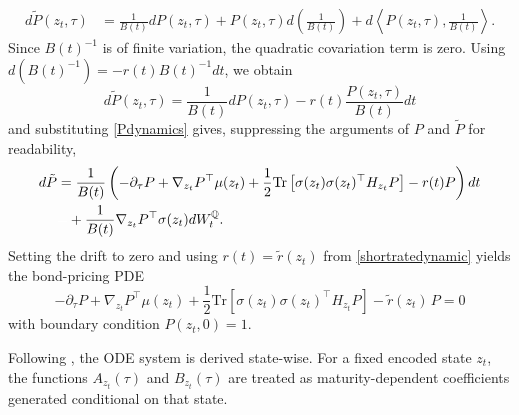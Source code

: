\begin{align*}
   d\tilde{P}(z_t,\tau)
&=
\frac{1}{B(t)}dP(z_t,\tau)
+
P(z_t,\tau)d\left(\frac{1}{B(t)}\right)
+
d\left\langle P(z_t,\tau),\frac{1}{B(t)}\right\rangle .
\end{align*}
Since \(B(t)^{-1}\) is of finite variation, the quadratic covariation term is zero. Using \(d(B(t)^{-1})=-r(t)B(t)^{-1}dt\), we obtain
$$ d\tilde{P}(z_t,\tau)=\frac{1}{B(t)}dP(z_t,\tau)-r(t)\frac{P(z_t,\tau)}{B(t)}dt$$
and substituting \eqref{Pdynamics} gives, suppressing the arguments of $P$ and $\tilde{P}$ for readability,
\begin{align*}
  d\tilde{P}&=\frac{1}{B(t)}\left(-\partial_\tau P+\nabla_{z_t} P^\top\mu(z_t)+\frac{1}{2}\mathrm{Tr}\left[\sigma(z_t)\sigma(z_t)^\top H_{z_t} P\right]-r(t)P\right)dt\\
  &\textcolor{white}{=}+\frac{1}{B(t)}\nabla_{z_t} P^\top\sigma(z_t)dW_t^\mathbb{Q}  .
\end{align*}
Setting the drift to zero and using $r(t)=\tilde{r}(z_t)$ from \eqref{shortratedynamic} yields the bond-pricing PDE 
\begin{equation}
-\partial_\tau P
+
\nabla_{z_t} P^\top \mu(z_t)
+
\frac12 \mathrm{Tr} \left[\sigma(z_t)\sigma(z_t)^\top H_{z_t} P \right]
-
\tilde r(z_t)\,P
=
0
\label{eq:bond_pricing_pde}
\end{equation}
with boundary condition $P(z_t,0)=1$. 



Following \citet{MatinWanPoulsen2025}, the ODE system is derived state-wise. For a fixed encoded state \(z_t\), the functions \(A_{z_t}(\tau)\) and \(B_{z_t}(\tau)\) are treated as maturity-dependent coefficients generated conditional on that state. 

